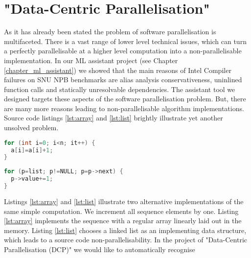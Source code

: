 \documentclass[10pt,a4paper]{report}
\begin{document}
\chapter{"Data-Centric Parallelisation"}
\label{chapter_dcp}
\quad As it has already been stated the problem of software parallelisation is multifaceted. There is a vast range of lower level technical issues, which can turn a perfectly parallelisable at a higher level computation into a non-parallelisable implementation. In our ML assistant project (see Chapter \ref{chapter_ml_assistant}) we showed that the main reasons of Intel Compiler failures on SNU NPB benchmarks are alias analysis conservativeness, uninlined function calls and statically unresolvable dependencies. The assistant tool we designed targets these aspects of the software parallelisation problem. But, there are many more reasons leading to non-parallelisable algorithm implementations. Source code listings \ref{lst:array} and \ref{lst:list} brightly illustrate yet another unsolved problem.\newline\null
\begin{minipage}[t]{0.45\linewidth}
\begin{lstlisting}[caption={Parallelisable loop operating on a \textbf{linear array}.},label={lst:array},language=C]
for (int i=0; i<n; it++) {
  a[i]=a[i]+1;
}
\end{lstlisting}
\end{minipage}
%
\begin{minipage}[t]{0.55\linewidth}
\begin{lstlisting}[caption={Non-parallelisable loop operating on a \textbf{linked-list}.},label={lst:list},language=C]
for (p=list; p!=NULL; p=p->next) {
  p->value+=1;
}
\end{lstlisting}
\end{minipage}
\quad Listings \ref{lst:array} and \ref{lst:list} illustrate two alternative implementations of the same simple computation. We increment all sequence elements by one. Listing \ref{lst:array} implements the sequence with a regular array linearly laid out in the memory. Listing \ref{lst:list} chooses a linked list as an implementing data structure, which leads to a source code non-parallelisability.\newline\null
\quad In the project of "Data-Centric Parallelisation (DCP)" we would like to automatically recognise 
\end{document}
